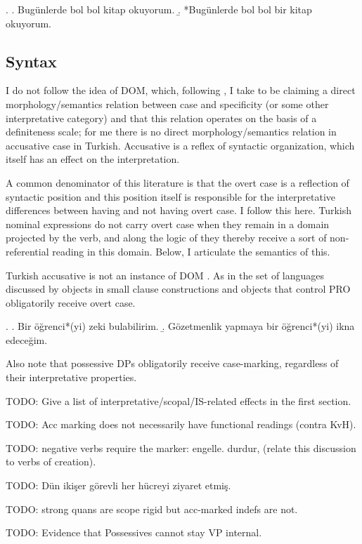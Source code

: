 \documentclass[11pt,a4paper]{article}
\begin{document}
\ex.
\a. Bugünlerde bol bol kitap okuyorum.
\b. *Bugünlerde bol bol bir kitap okuyorum.

\subsection{Syntax}

I do not follow the idea of DOM, which, following \cite{lopez12}, I take to be claiming a direct morphology/semantics relation between case and specificity (or some other interpretative category) and that this relation operates on the basis of a definiteness scale; for me there is no direct morphology/semantics relation in accusative case in Turkish. Accusative is a reflex of syntactic organization, which itself has an effect on the interpretation.


 A common denominator of this literature is that the overt case is a reflection of syntactic position and this position itself is responsible for the interpretative differences between having and not having overt case. I follow this here. Turkish nominal expressions do not carry overt case when they remain in a domain projected by the verb, and along the logic of  they thereby receive a sort of non-referential reading in this domain. Below, I articulate the semantics of this.    

Turkish accusative is not an instance of DOM \cite{aissen03}. As in the set of languages discussed by \cite{lopez12} objects in small clause constructions and objects that control PRO obligatorily receive overt case.

\ex.
\a. Bir öğrenci*(yi) zeki bulabilirim.
\b. Gözetmenlik yapmaya bir öğrenci*(yi) ikna edeceğim. 

Also note that possessive DPs obligatorily receive case-marking, regardless of their interpretative properties.

TODO: Give a list of interpretative/scopal/IS-related effects in the first section.

TODO: Acc marking does not necessarily have functional readings (contra KvH).

TODO: negative verbs require the marker: engelle. durdur, (relate this discussion to verbs of creation).

TODO: Dün ikişer görevli her hücreyi ziyaret etmiş.

TODO: strong quans are scope rigid but acc-marked indefs are not.

TODO: Evidence that Possessives cannot stay VP internal.
\end{document}
